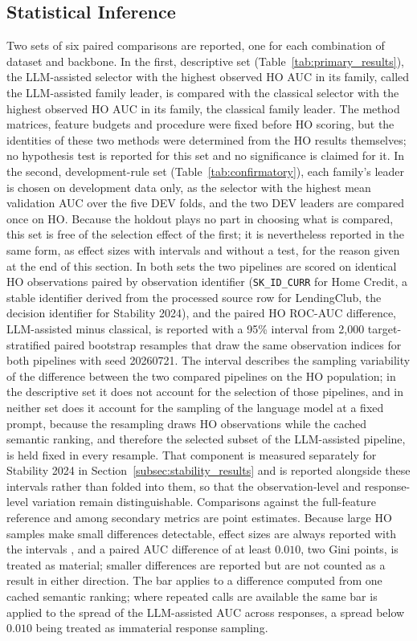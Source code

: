 \documentclass[final,5p,twocolumn]{elsarticle}
\begin{document}
\subsection{Statistical Inference}
\label{subsec:inference}

Two sets of six paired comparisons are reported, one for each combination of dataset and backbone. In the first, descriptive set (Table~\ref{tab:primary_results}), the LLM-assisted selector with the highest observed HO AUC in its family, called the LLM-assisted family leader, is compared with the classical selector with the highest observed HO AUC in its family, the classical family leader. The method matrices, feature budgets and procedure were fixed before HO scoring, but the identities of these two methods were determined from the HO results themselves; no hypothesis test is reported for this set and no significance is claimed for it. In the second, development-rule set (Table~\ref{tab:confirmatory}), each family's leader is chosen on development data only, as the selector with the highest mean validation AUC over the five DEV folds, and the two DEV leaders are compared once on HO. Because the holdout plays no part in choosing what is compared, this set is free of the selection effect of the first; it is nevertheless reported in the same form, as effect sizes with intervals and without a test, for the reason given at the end of this section. In both sets the two pipelines are scored on identical HO observations paired by observation identifier (\texttt{SK\_\allowbreak ID\_\allowbreak CURR} for Home Credit, a stable identifier derived from the processed source row for LendingClub, the decision identifier for Stability 2024), and the paired HO ROC-AUC difference, LLM-assisted minus classical, is reported with a 95\% interval from 2,000 target-stratified paired bootstrap resamples that draw the same observation indices for both pipelines \cite{efron1993} with seed 20260721. The interval describes the sampling variability of the difference between the two compared pipelines on the HO population; in the descriptive set it does not account for the selection of those pipelines, and in neither set does it account for the sampling of the language model at a fixed prompt, because the resampling draws HO observations while the cached semantic ranking, and therefore the selected subset of the LLM-assisted pipeline, is held fixed in every resample. That component is measured separately for Stability 2024 in Section~\ref{subsec:stability_results} and is reported alongside these intervals rather than folded into them, so that the observation-level and response-level variation remain distinguishable. Comparisons against the full-feature reference and among secondary metrics are point estimates. Because large HO samples make small differences detectable, effect sizes are always reported with the intervals \cite{demsar2006}, and a paired AUC difference of at least $0.010$, two Gini points, is treated as material; smaller differences are reported but are not counted as a result in either direction. The bar applies to a difference computed from one cached semantic ranking; where repeated calls are available the same bar is applied to the spread of the LLM-assisted AUC across responses, a spread below $0.010$ being treated as immaterial response sampling.
\end{document}
